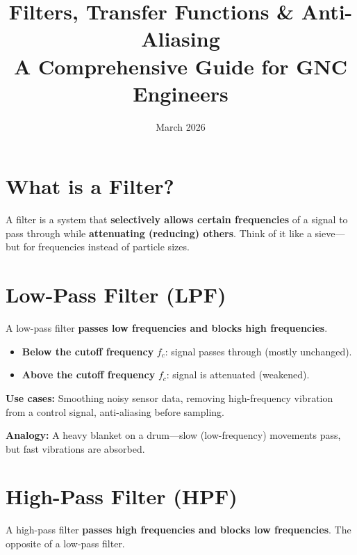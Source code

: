 \documentclass[12pt,a4paper]{article}
\title{\textbf{Filters, Transfer Functions \& Anti-Aliasing}\\[0.5em]
       \large A Comprehensive Guide for GNC Engineers}
\author{}
\date{March 2026}
\begin{document}
\maketitle
\tableofcontents
\newpage

\section{What is a Filter?}

A filter is a system that \textbf{selectively allows certain frequencies} of a signal to pass through while \textbf{attenuating (reducing) others}. Think of it like a sieve---but for frequencies instead of particle sizes.

\section{Low-Pass Filter (LPF)}

A low-pass filter \textbf{passes low frequencies and blocks high frequencies}.

\begin{itemize}
    \item \textbf{Below the cutoff frequency} $f_c$: signal passes through (mostly unchanged).
    \item \textbf{Above the cutoff frequency} $f_c$: signal is attenuated (weakened).
\end{itemize}

\textbf{Use cases:} Smoothing noisy sensor data, removing high-frequency vibration from a control signal, anti-aliasing before sampling.

\textbf{Analogy:} A heavy blanket on a drum---slow (low-frequency) movements pass, but fast vibrations are absorbed.

\section{High-Pass Filter (HPF)}

A high-pass filter \textbf{passes high frequencies and blocks low frequencies}. The opposite of a low-pass filter.
\end{document}
